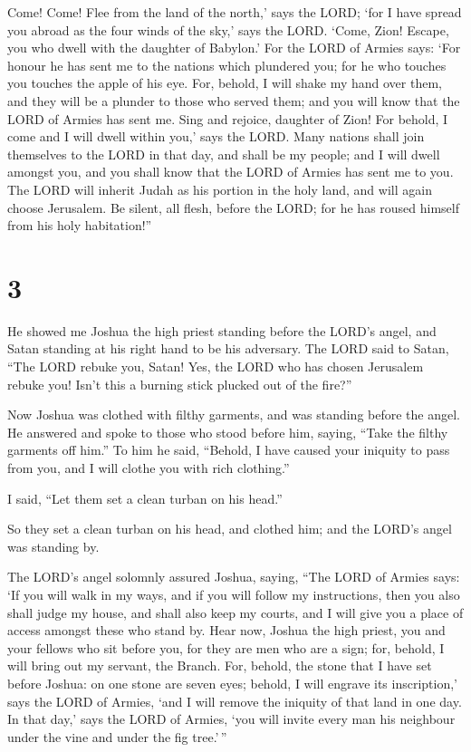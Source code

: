  Come! Come! Flee from the land of the north,' says the
LORD; `for I have spread you abroad as the four winds of the sky,' says
the LORD.  `Come, Zion! Escape, you who dwell with the
daughter of Babylon.'  For the LORD of Armies says: `For
honour he has sent me to the nations which plundered you; for he who
touches you touches the apple of his eye.  For, behold, I
will shake my hand over them, and they will be a plunder to those who
served them; and you will know that the LORD of Armies has sent me.
 Sing and rejoice, daughter of Zion! For behold, I come and
I will dwell within you,' says the LORD.  Many nations
shall join themselves to the LORD in that day, and shall be my people;
and I will dwell amongst you, and you shall know that the LORD of Armies
has sent me to you.  The LORD will inherit Judah as his
portion in the holy land, and will again choose Jerusalem. 
Be silent, all flesh, before the LORD; for he has roused himself from
his holy habitation!''

\hypertarget{section-2}{%
\section{3}\label{section-2}}

 He showed me Joshua the high priest standing before the
LORD's angel, and Satan standing at his right hand to be his adversary.
 The LORD said to Satan, ``The LORD rebuke you, Satan! Yes,
the LORD who has chosen Jerusalem rebuke you! Isn't this a burning stick
plucked out of the fire?''

 Now Joshua was clothed with filthy garments, and was
standing before the angel.  He answered and spoke to those
who stood before him, saying, ``Take the filthy garments off him.'' To
him he said, ``Behold, I have caused your iniquity to pass from you, and
I will clothe you with rich clothing.''

 I said, ``Let them set a clean turban on his head.''

So they set a clean turban on his head, and clothed him; and the LORD's
angel was standing by.

 The LORD's angel solomnly assured Joshua, saying,
 ``The LORD of Armies says: `If you will walk in my ways,
and if you will follow my instructions, then you also shall judge my
house, and shall also keep my courts, and I will give you a place of
access amongst these who stand by.  Hear now, Joshua the
high priest, you and your fellows who sit before you, for they are men
who are a sign; for, behold, I will bring out my servant, the Branch.
 For, behold, the stone that I have set before Joshua: on
one stone are seven eyes; behold, I will engrave its inscription,' says
the LORD of Armies, `and I will remove the iniquity of that land in one
day.  In that day,' says the LORD of Armies, `you will
invite every man his neighbour under the vine and under the fig
tree.'\,''

